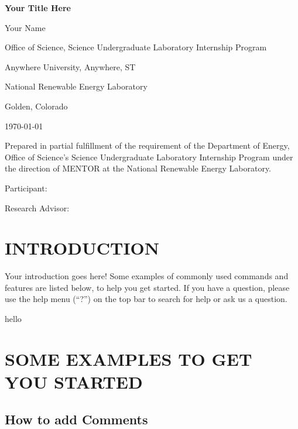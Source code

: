 \documentclass[12pt]{article}
\begin{document}
\begin{titlepage}
	\thispagestyle{fancy}
	{\centering

	{\huge\bfseries Your Title Here\par}
		\vspace{1.5cm}
	{\Large Your Name\par}
    \vspace{2cm}
    {\large Office of Science, Science Undergraduate Laboratory Internship Program \par
	Anywhere University, Anywhere, ST \par}
	\vspace{1cm}
	{\large National Renewable Energy Laboratory
    \par Golden, Colorado
	\par}
	\vfill
	{\large \today\par}}
	\vfill
    
	Prepared in partial fulfillment of the requirement of the Department of Energy, Office of Science’s Science Undergraduate Laboratory Internship Program under the direction of MENTOR at the National Renewable Energy Laboratory. \par
	\vspace{2cm}
    Participant: 
    \par
    \vspace{2cm}
    Research Advisor:
    \vfill
\end{titlepage}

\begin{abstract}
\setcounter{page}{2}
Your abstract.
\end{abstract}

\section{INTRODUCTION}

Your introduction goes here! Some examples of commonly used commands and features are listed below, to help you get started. If you have a question, please use the help menu (``?'') on the top bar to search for help or ask us a question.

hello

\section{SOME EXAMPLES TO GET YOU STARTED}

\subsection{How to add Comments}
\end{document}
